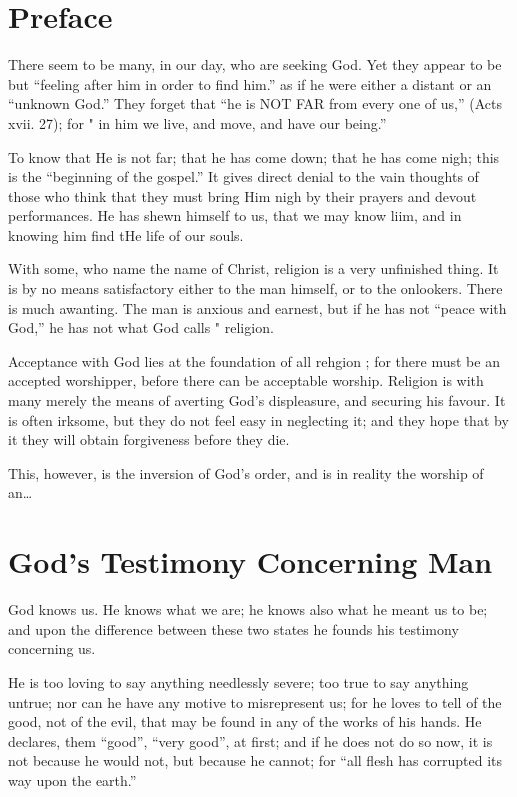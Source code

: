 \documentclass[
]{book}
\begin{document}
\clearpage
\setcounter{page}{1}

\hypertarget{preface}{%
\chapter*{Preface}\label{preface}}

There seem to be many, in our day, who are seeking God. Yet they appear to be but ``feeling after him in order to find him.'' as if he were either a distant or an ``unknown God.'' They forget that ``he is NOT FAR from every one of us,'' (Acts xvii. 27); for " in him we live, and move, and have our being.''

To know that He is not far; that he has come down; that he has come nigh; this is the ``beginning of the gospel.'' It gives direct denial to the vain thoughts of those who think that they must bring Him nigh by their prayers and devout performances. He has shewn himself to us, that we may know liim, and in knowing him find tHe life of our souls.

With some, who name the name of Christ, religion is a very unfinished thing. It is by no means satisfactory either to the man himself, or to the onlookers. There is much awanting. The man is anxious and earnest, but if he has not ``peace with God,'' he has not what God calls " religion.

Acceptance with God lies at the foundation of all rehgion ; for there must be an accepted worshipper, before there can be acceptable worship. Religion is with many merely the means of averting God's displeasure, and securing his favour. It is often irksome, but they do not feel easy in neglecting it; and they hope that by it they will obtain forgiveness before they die.

This, however, is the inversion of God's order, and is in reality the worship of an\ldots{}

\hypertarget{gods-testimony-concerning-man}{%
\chapter{God's Testimony Concerning Man}\label{gods-testimony-concerning-man}}

God knows us. He knows what we are; he knows also what he meant us to be; and upon the difference between these two states he founds his testimony concerning us.

He is too loving to say anything needlessly severe; too true to say anything untrue; nor can he have any motive to misrepresent us; for he loves to tell of the good, not of the evil, that may be found in any of the works of his hands. He declares, them ``good'', ``very good'', at first; and if he does not do so now, it is not because he would not, but because he cannot; for ``all flesh has corrupted its way upon the earth.''
\end{document}
